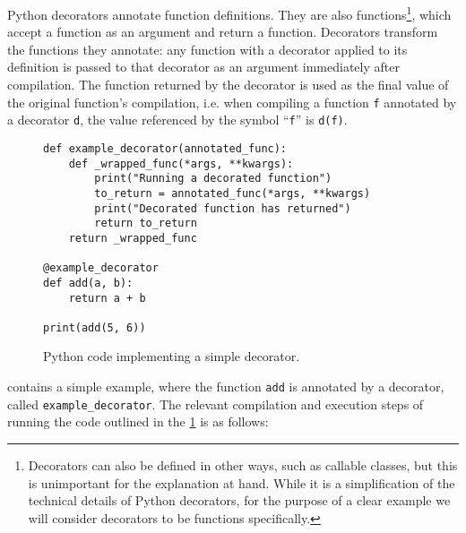 Python decorators annotate function definitions. They are also
functions\footnote{Decorators can also be defined in other ways, such as
callable classes, but this is unimportant for the explanation at hand. While it
is a simplification of the technical details of Python decorators, for the
purpose of a clear example we will consider decorators to be functions
specifically.}, which accept a function as an argument and return a function.
Decorators transform the functions they annotate: any function with a decorator
applied to its definition is passed to that decorator as an argument immediately
after compilation. The function returned by the decorator is used as the final
value of the original function's compilation, i.e. when compiling a function
\lstinline{f} annotated by a decorator \lstinline{d}, the value referenced by
the symbol ``\lstinline{f}'' is \lstinline{d(f)}.

\begin{figure}[h]\label{decorator_simple_explanation}
    \begin{center}
        \begin{lstlisting}
def example_decorator(annotated_func):
    def _wrapped_func(*args, **kwargs):
        print("Running a decorated function")
        to_return = annotated_func(*args, **kwargs)
        print("Decorated function has returned")
        return to_return
    return _wrapped_func

@example_decorator
def add(a, b):
    return a + b

print(add(5, 6))
        \end{lstlisting}
    \end{center}
    \caption{Python code implementing a simple decorator.}
\end{figure}


 contains a simple example, where the
function \lstinline{add} is annotated by a decorator, called
\lstinline{example_decorator}. The relevant compilation and execution steps of
running the code outlined in the \cref{decorator_simple_explanation} is as
follows:

